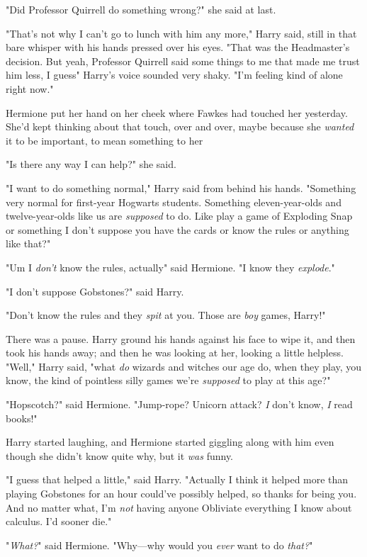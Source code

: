 "Did Professor Quirrell do something wrong?" she said at last.

"That's not why I can't go to lunch with him any more," Harry said, still in
that bare whisper with his hands pressed over his eyes. "That was the
Headmaster's decision. But yeah, Professor Quirrell said some things to me that
made me trust him less, I guess{\el}" Harry's voice sounded very shaky. "I'm
feeling kind of alone right now."

Hermione put her hand on her cheek where Fawkes had touched her yesterday.
She'd kept thinking about that touch, over and over, maybe because she
\emph{wanted} it to be important, to mean something to her{\el}

"Is there any way I can help?" she said.

"I want to do something normal," Harry said from behind his hands. "Something
very normal for first-year Hogwarts students. Something eleven-year-olds and
twelve-year-olds like us are \emph{supposed} to do. Like play a game of
Exploding Snap or something{\el} I don't suppose you have the cards or know
the rules or anything like that?"

"Um{\el} I \emph{don't} know the rules, actually{\el}" said Hermione. "I
know they \emph{explode}."

"I don't suppose Gobstones?" said Harry.

"Don't know the rules and they \emph{spit} at you. Those are \emph{boy} games,
Harry!"

There was a pause. Harry ground his hands against his face to wipe it, and then
took his hands away; and then he was looking at her, looking a little helpless.
"Well," Harry said, "what \emph{do} wizards and witches our age do, when they
play, you know, the kind of pointless silly games we're \emph{supposed} to play
at this age?"

"Hopscotch?" said Hermione. "Jump-rope? Unicorn attack? \emph{I} don't know,
\emph{I} read books!"

Harry started laughing, and Hermione started giggling along with him even
though she didn't know quite why, but it \emph{was} funny.

"I guess that helped a little," said Harry. "Actually I think it helped more
than playing Gobstones for an hour could've possibly helped, so thanks for
being you. And no matter what, I'm \emph{not} having anyone Obliviate
everything I know about calculus. I'd sooner die."

"\emph{What?}" said Hermione. "Why—why would you \emph{ever} want to do
\emph{that?}"

